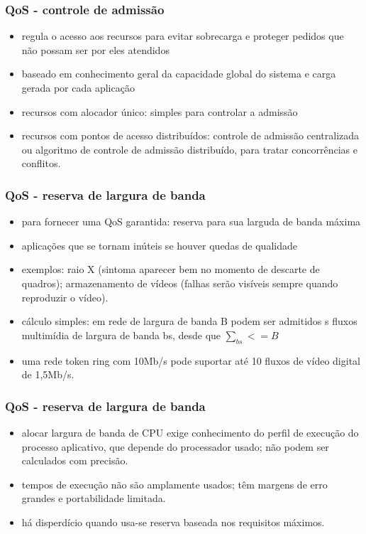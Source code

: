 \documentclass[]{beamer}
\begin{document}
\begin{frame}
  \frametitle{QoS - controle de admissão}
\begin{itemize}
  \item regula o acesso aos recursos para evitar sobrecarga e proteger pedidos que não possam
ser por eles atendidos
  \item baseado em conhecimento geral da capacidade global do sistema e carga gerada
por cada aplicação
  \item recursos com alocador único: simples para controlar a admissão
  \item recursos com pontos de acesso distribuídos: controle de admissão centralizada
ou algoritmo de controle de admissão distribuído, para tratar concorrências e conflitos.
\end{itemize}
\end{frame}

\begin{frame}
  \frametitle{QoS - reserva de largura de banda}
\begin{itemize}
  \item para fornecer uma QoS garantida: reserva para sua larguda de banda máxima
  \item aplicações que se tornam inúteis se houver quedas de qualidade
  \item exemplos: raio X (sintoma aparecer bem no momento de descarte de quadros); 
armazenamento de vídeos (falhas serão visíveis sempre quando reproduzir o vídeo).
  \item cálculo simples: em rede de largura de banda B podem ser admitidos s fluxos
multimídia de largura de banda bs, desde que $\sum_{bs} <= B$
  \item uma rede token ring com 10Mb/s pode suportar até 10 fluxos de vídeo digital de
1,5Mb/s.
\end{itemize}
\end{frame}


\begin{frame}
  \frametitle{QoS - reserva de largura de banda}
\begin{itemize}
  \item alocar largura de banda de CPU exige conhecimento do perfil de execução do processo
aplicativo, que depende do processador usado; não podem ser calculados com precisão.
  \item tempos de execução não são amplamente usados; têm margens de erro grandes e 
portabilidade limitada.
  \item há disperdício quando usa-se reserva baseada nos requisitos máximos.
\end{itemize}
\end{frame}
\end{document}
